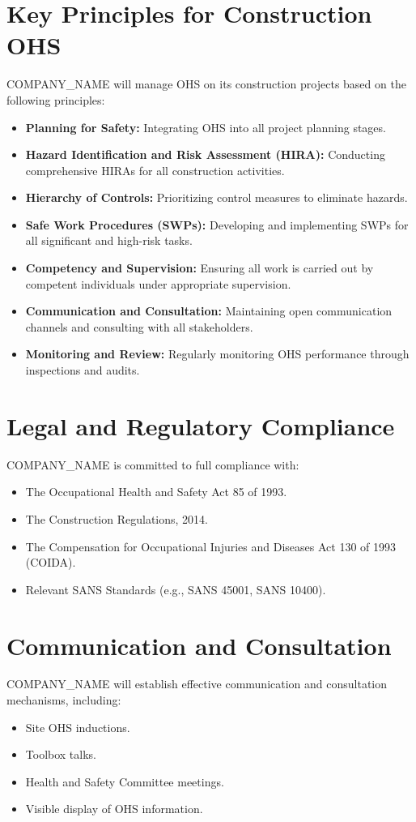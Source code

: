\documentclass[12pt]{article}
\begin{document}
\section{Key Principles for Construction OHS}
{{COMPANY_NAME}} will manage OHS on its construction projects based on the following principles:
\begin{itemize}
    \item \textbf{Planning for Safety:} Integrating OHS into all project planning stages.
    \item \textbf{Hazard Identification and Risk Assessment (HIRA):} Conducting comprehensive HIRAs for all construction activities.
    \item \textbf{Hierarchy of Controls:} Prioritizing control measures to eliminate hazards.
    \item \textbf{Safe Work Procedures (SWPs):} Developing and implementing SWPs for all significant and high-risk tasks.
    \item \textbf{Competency and Supervision:} Ensuring all work is carried out by competent individuals under appropriate supervision.
    \item \textbf{Communication and Consultation:} Maintaining open communication channels and consulting with all stakeholders.
    \item \textbf{Monitoring and Review:} Regularly monitoring OHS performance through inspections and audits.
\end{itemize}

\section{Legal and Regulatory Compliance}
{{COMPANY_NAME}} is committed to full compliance with:
\begin{itemize}
    \item The Occupational Health and Safety Act 85 of 1993.
    \item The Construction Regulations, 2014.
    \item The Compensation for Occupational Injuries and Diseases Act 130 of 1993 (COIDA).
    \item Relevant SANS Standards (e.g., SANS 45001, SANS 10400).
\end{itemize}

\section{Communication and Consultation}
{{COMPANY_NAME}} will establish effective communication and consultation mechanisms, including:
\begin{itemize}
    \item Site OHS inductions.
    \item Toolbox talks.
    \item Health and Safety Committee meetings.
    \item Visible display of OHS information.
\end{itemize}
\end{document}
